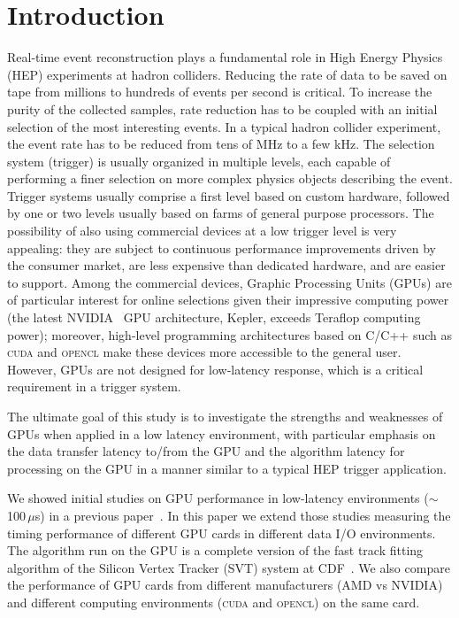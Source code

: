 \documentclass[letterpaper]{jpconf}
\begin{document}
\section{Introduction}
Real-time event reconstruction plays a fundamental role in High Energy
Physics (HEP) experiments at hadron colliders.  Reducing the rate of
data to be saved on tape from millions to hundreds of events per
second is critical. To increase the purity of the collected samples,
rate reduction has to be coupled with an initial selection of the most
interesting events.  In a typical hadron collider experiment, the
event rate has to be reduced from tens of MHz to a few kHz.  The
selection system (trigger) is usually organized in multiple levels,
each capable of performing a finer selection on more complex physics
objects describing the event. Trigger systems usually comprise a first
level based on custom hardware, followed by one or two levels usually
based on farms of general purpose processors.  The possibility of also
using commercial devices at a low trigger level is very appealing:
they are subject to continuous performance improvements driven by the
consumer market, are less expensive than dedicated hardware, and are
easier to support.  Among the commercial devices, Graphic Processing
Units (GPUs) are of particular interest for online selections given
their impressive computing power (the latest NVIDIA~\cite{bib_nvidia}
GPU architecture, Kepler, exceeds Teraflop computing power); moreover,
high-level programming architectures based on C/C++ such as
\textsc{cuda} and \textsc{opencl} make these devices more accessible
to the general user.  However, GPUs are not designed for low-latency
response, which is a critical requirement in a trigger system.

The ultimate goal of this study is to investigate the strengths and weaknesses
of GPUs when applied in a low latency environment, with particular
emphasis on the data transfer latency to/from the GPU and the
algorithm latency for processing on the GPU in a manner similar to a
typical HEP trigger application.

We showed initial studies on GPU performance in low-latency
environments ($\sim$100\,$\mu$s) in a previous paper~\cite{TIPP2011,
  NSS2012}.  In this paper we extend those studies measuring the
timing performance of different GPU cards in different data I/O
environments. The algorithm run on the GPU is a complete version of
the fast track fitting algorithm of the Silicon Vertex Tracker (SVT)
system at CDF~\cite{SVT1}. We also compare the performance of GPU
cards from different manufacturers (AMD vs NVIDIA) and different
computing environments (\textsc{cuda} and \textsc{opencl}) on the same
card. 
\end{document}
